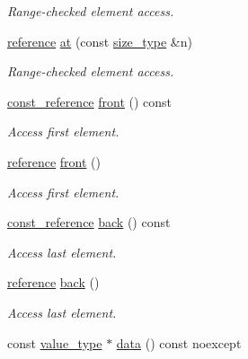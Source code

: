 \begin{DoxyCompactItemize}
\begin{DoxyCompactList}\small\item\em Range-\/checked element access. \end{DoxyCompactList}\item 
\hyperlink{classIceBRG_1_1element__accessor_ae31e9fe4b35d76ed6055052fb788de13}{reference} \hyperlink{classIceBRG_1_1element__accessor_aaa4ed7ea60a206ce193115e8b5c7c558}{at} (const \hyperlink{classIceBRG_1_1element__accessor_aec3d016f3c5e84e7f9248669a9571208}{size\+\_\+type} \&n)
\begin{DoxyCompactList}\small\item\em Range-\/checked element access. \end{DoxyCompactList}\item 
\hyperlink{classIceBRG_1_1element__accessor_aa5a74be2decaa60d9080c4f1b4d3dcb8}{const\+\_\+reference} \hyperlink{classIceBRG_1_1element__accessor_a2595c51f419c4a0bbeb93c917d4269a9}{front} () const 
\begin{DoxyCompactList}\small\item\em Access first element. \end{DoxyCompactList}\item 
\hyperlink{classIceBRG_1_1element__accessor_ae31e9fe4b35d76ed6055052fb788de13}{reference} \hyperlink{classIceBRG_1_1element__accessor_aa335b47981fd9d132077256abf95c47e}{front} ()
\begin{DoxyCompactList}\small\item\em Access first element. \end{DoxyCompactList}\item 
\hyperlink{classIceBRG_1_1element__accessor_aa5a74be2decaa60d9080c4f1b4d3dcb8}{const\+\_\+reference} \hyperlink{classIceBRG_1_1element__accessor_a15ceb15000c2fb5079cb9bce6c956aa5}{back} () const 
\begin{DoxyCompactList}\small\item\em Access last element. \end{DoxyCompactList}\item 
\hyperlink{classIceBRG_1_1element__accessor_ae31e9fe4b35d76ed6055052fb788de13}{reference} \hyperlink{classIceBRG_1_1element__accessor_a1949693135631a260930a5ae9326ccd7}{back} ()
\begin{DoxyCompactList}\small\item\em Access last element. \end{DoxyCompactList}\item 
const \hyperlink{classIceBRG_1_1element__accessor_ab6c9120cd75bb9ea751fab09967baee9}{value\+\_\+type} $\ast$ \hyperlink{classIceBRG_1_1element__accessor_a9fe00642b678ee4abe3847ff59160253}{data} () const  noexcept

\end{DoxyCompactItemize}
